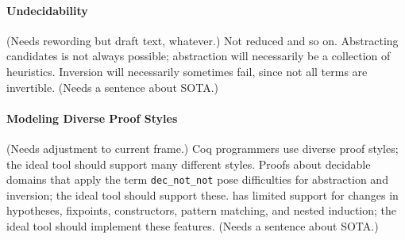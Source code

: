\paragraph{Undecidability} (Needs rewording but draft text, whatever.)
Not reduced and so on.
Abstracting candidates is not always possible; abstraction will necessarily be a collection of heuristics.
Inversion will necessarily sometimes fail, since not all terms are invertible.
(Needs a sentence about SOTA.)

\paragraph{Modeling Diverse Proof Styles} (Needs adjustment to current frame.)
Coq programmers use diverse proof styles; the ideal tool should support many different styles.
Proofs about decidable domains that apply the term \lstinline{dec_not_not}
pose difficulties for abstraction and inversion; the ideal tool should support these. 
\sysname has limited support for changes in hypotheses, fixpoints, constructors, 
pattern matching, and nested induction; the ideal tool should implement these features.
(Needs a sentence about SOTA.)

